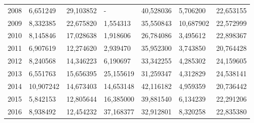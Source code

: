 \begin{table}
\begin{tabular}{p{1cm}p{2cm}p{2cm}p{2cm}p{2cm}p{2cm}p{2cm}}
 2008 &             6,651249 &                                   29,103852 &                                                  - &                  40,528036 &                                    5,706200 &                           22,653155 \\
 2009 &             8,332385 &                                   22,675820 &                                           1,554313 &                  35,550843 &                                   10,687902 &                           22,572999 \\
 2010 &             8,145846 &                                   17,028638 &                                           1,918606 &                  26,784086 &                                    3,495612 &                           22,898367 \\
 2011 &             6,907619 &                                   12,274620 &                                           2,939470 &                  35,952300 &                                    3,743850 &                           20,764428 \\
 2012 &             8,240568 &                                   14,346223 &                                           6,190697 &                  33,342255 &                                    4,285302 &                           24,159605 \\
 2013 &             6,551763 &                                   15,656395 &                                          25,155619 &                  31,259347 &                                    4,312829 &                           24,538141 \\
 2014 &            10,907242 &                                   14,673403 &                                          14,653148 &                  42,116182 &                                    4,959359 &                           20,736442 \\
 2015 &             5,842153 &                                   12,805644 &                                          16,385000 &                  39,881540 &                                    6,134239 &                           22,291206 \\
 2016 &             8,938492 &                                   12,454232 &                                          37,168377 &                  32,912801 &                                    8,320258 &                           22,835380 \\
\bottomrule
\end{tabular}
\end{table}
